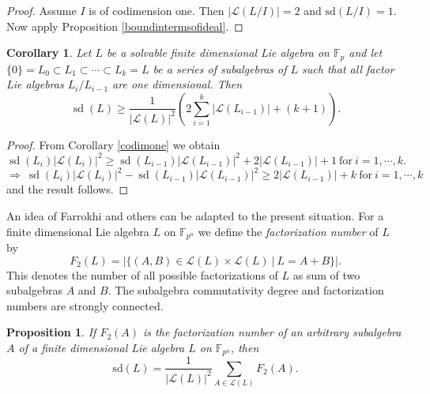 \documentclass{amsart}
\newtheorem{corollary}[theorem]{Corollary}
\newtheorem{proposition}[theorem]{Proposition}
\theoremstyle{definition}
\numberwithin{equation}{section}
\begin{document}
\begin{proof}
Assume $I$  is of codimension one. Then $|\mathcal{L}(L/I)|=2$ and  $\mathrm{sd}(L/I) =1$.  Now apply Proposition \ref{boundintermsofideal}.
\end{proof} 


\begin{corollary} Let $L$ be a solvable finite dimensional Lie algebra on $\mathbb{F}_p$ and let $\{0\}=L_0 \subset L_1 \subset \cdots \subset L_k=L$ be a series of subalgebras of $L$ such that all factor Lie algebras $L_i/L_{i-1}$ are one dimensional. Then 
    $$\operatorname{sd}(L) \geqslant \frac{1}{|\mathcal{L}(L)|^2}\left(2 \sum_{i=1}^k\left|\mathcal{L}\left(L_{i-1}\right)\right|+(k+1)\right).
$$
\end{corollary}
 \begin{proof}
From Corollary \ref{codimone}  we obtain
  $$\operatorname{sd}\left(L_i\right)\left|\mathcal{L}\left(L_i\right)\right|^2 \geqslant \operatorname{sd}\left(L_{i-1}\right)\left|\mathcal{L}\left(L_{i-1}\right)\right|^2+2\left|\mathcal{L}\left(L_{i-1}\right)\right|+1 \ \mbox{for} \ i=1,\cdots,k. $$ 
\[ \label{solvablebound} \Longrightarrow \ \operatorname{sd}\left(L_i\right)\left|\mathcal{L}\left(L_i\right)\right|^2 -
 \operatorname{sd}\left(L_{i-1}\right)\left|\mathcal{L}\left(L_{i-1}\right)\right|^2
 \geqslant
 2\left|\mathcal{L}\left(L_{i-1}\right)\right|+k \ \mbox{for} \ i=1,\cdots,k
\] and the result follows. \end{proof} 




An idea of Farrokhi and others \cite{farrokhi1, farrokhi2}  can be adapted to the present situation. For a finite dimensional Lie algebra $L$ on $\mathbb{F}_{p^n}$ we define the \textit{factorization number} of $L$ by 
$$F_2(L)=|\{(A,B)\in \mathcal{L}(L) \times \mathcal{L}(L) \ | \ L= A + B \}|.$$ 
This denotes the number of all possible factorizations of $L$ as sum of two subalgebras $A$ and $B$. The subalgebra commutativity degree and factorization numbers are strongly connected.


\begin{proposition} \label{sdandf2} If $F_2(A)$ is the factorization number of an arbitrary subalgebra $A$ of a finite dimensional Lie algebra $L$ on $\mathbb{F}_{p^n}$, then
\[     \mathrm{sd}(L)=\frac{1}{|\mathcal{L}(L)|^2}\underset{A\in \mathcal{L}(L)}{\sum} F_2(A). \]
\end{proposition}
\end{document}
